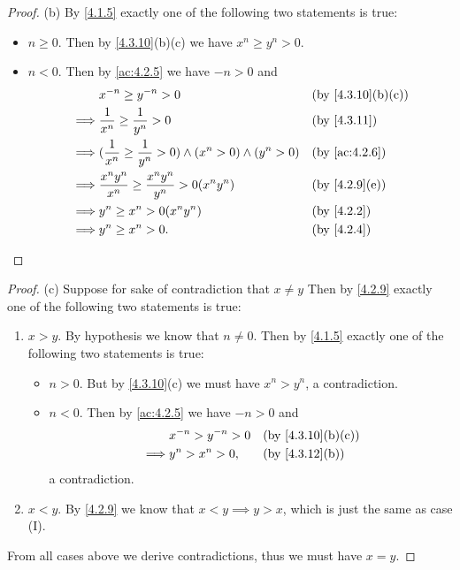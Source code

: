 \begin{proof}{(b)}
  By \cref{4.1.5} exactly one of the following two statements is true:
  \begin{itemize}
    \item \(n \geq 0\).
          Then by \cref{4.3.10}(b)(c) we have \(x^n \geq y^n > 0\).
    \item \(n < 0\).
          Then by \cref{ac:4.2.5} we have \(-n > 0\) and
          \begin{align*}
                     & x^{-n} \geq y^{-n} > 0                                                   &  & \text{(by \cref{4.3.10}(b)(c))} \\
            \implies & \dfrac{1}{x^n} \geq \dfrac{1}{y^n} > 0                                   &  & \text{(by \cref{4.3.11})}       \\
            \implies & (\dfrac{1}{x^n} \geq \dfrac{1}{y^n} > 0) \land (x^n > 0) \land (y^n > 0) &  & \text{(by \cref{ac:4.2.6})}     \\
            \implies & \dfrac{x^n y^n}{x^n} \geq \dfrac{x^n y^n}{y^n} > 0(x^n y^n)              &  & \text{(by \cref{4.2.9}(e))}     \\
            \implies & y^n \geq x^n > 0(x^n y^n)                                                &  & \by{4.2.2}                      \\
            \implies & y^n \geq x^n > 0.                                                        &  & \by{4.2.4}
          \end{align*}
  \end{itemize}
\end{proof}

\begin{proof}{(c)}
  Suppose for sake of contradiction that \(x \neq y\)
  Then by \cref{4.2.9} exactly one of the following two statements is true:
  \begin{enumerate}[label=(\Roman*)]
    \item \(x > y\).
          By hypothesis we know that \(n \neq 0\).
          Then by \cref{4.1.5} exactly one of the following two statements is true:
          \begin{itemize}
            \item \(n > 0\).
                  But by \cref{4.3.10}(c) we must have \(x^n > y^n\), a contradiction.
            \item \(n < 0\).
                  Then by \cref{ac:4.2.5} we have \(-n > 0\) and
                  \begin{align*}
                             & x^{-n} > y^{-n} > 0 &  & \text{(by \cref{4.3.10}(b)(c))} \\
                    \implies & y^n > x^n > 0,      &  & \text{(by \cref{4.3.12}(b))}
                  \end{align*}
                  a contradiction.
          \end{itemize}
    \item \(x < y\).
          By \cref{4.2.9} we know that \(x < y \implies y > x\), which is just the same as case (I).
  \end{enumerate}
  From all cases above we derive contradictions, thus we must have \(x = y\).
\end{proof}

